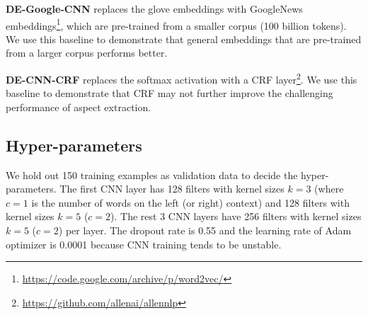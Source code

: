 \documentclass[11pt,a4paper]{article}
\begin{document}
\textbf{DE-Google-CNN} replaces the glove embeddings with GoogleNews embeddings\footnote{\url{https://code.google.com/archive/p/word2vec/} }, which are pre-trained from a smaller corpus (100 billion tokens). We use this baseline to demonstrate that general embeddings that are pre-trained from a larger corpus performs better.

\textbf{DE-CNN-CRF} replaces the softmax activation with a CRF layer\footnote{\url{https://github.com/allenai/allennlp}}. We use this baseline to demonstrate that CRF may not further improve the challenging performance of aspect extraction.

\subsection{Hyper-parameters}
We hold out 150 training examples as validation data to decide the hyper-parameters.
The first CNN layer has 128 filters with kernel sizes $k=3$ (where $c=1$ is the number of words on the left (or right) context) and 128 filters with kernel sizes $k=5$ ($c=2$).
The rest 3 CNN layers have 256 filters with kernel sizes $k=5$ ($c=2$) per layer.
The dropout rate is 0.55 and the learning rate of Adam optimizer \cite{kingma2014adam} is 0.0001 because CNN training tends to be unstable.
\end{document}
